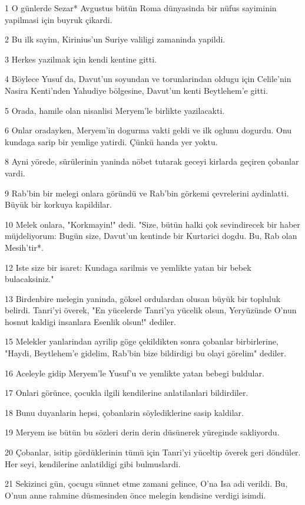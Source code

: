 \par 1 O günlerde Sezar* Avgustus bütün Roma dünyasinda bir nüfus sayiminin yapilmasi için buyruk çikardi.
\par 2 Bu ilk sayim, Kirinius'un Suriye valiligi zamaninda yapildi.
\par 3 Herkes yazilmak için kendi kentine gitti.
\par 4 Böylece Yusuf da, Davut'un soyundan ve torunlarindan oldugu için Celile'nin Nasira Kenti'nden Yahudiye bölgesine, Davut'un kenti Beytlehem'e gitti.
\par 5 Orada, hamile olan nisanlisi Meryem'le birlikte yazilacakti.
\par 6 Onlar oradayken, Meryem'in dogurma vakti geldi ve ilk oglunu dogurdu. Onu kundaga sarip bir yemlige yatirdi. Çünkü handa yer yoktu.
\par 8 Ayni yörede, sürülerinin yaninda nöbet tutarak geceyi kirlarda geçiren çobanlar vardi.
\par 9 Rab'bin bir melegi onlara göründü ve Rab'bin görkemi çevrelerini aydinlatti. Büyük bir korkuya kapildilar.
\par 10 Melek onlara, "Korkmayin!" dedi. "Size, bütün halki çok sevindirecek bir haber müjdeliyorum: Bugün size, Davut'un kentinde bir Kurtarici dogdu. Bu, Rab olan Mesih'tir*.
\par 12 Iste size bir isaret: Kundaga sarilmis ve yemlikte yatan bir bebek bulacaksiniz."
\par 13 Birdenbire melegin yaninda, göksel ordulardan olusan büyük bir topluluk belirdi. Tanri'yi överek, "En yücelerde Tanri'ya yücelik olsun, Yeryüzünde O'nun hosnut kaldigi insanlara Esenlik olsun!" dediler.
\par 15 Melekler yanlarindan ayrilip göge çekildikten sonra çobanlar birbirlerine, "Haydi, Beytlehem'e gidelim, Rab'bin bize bildirdigi bu olayi görelim" dediler.
\par 16 Aceleyle gidip Meryem'le Yusuf'u ve yemlikte yatan bebegi buldular.
\par 17 Onlari görünce, çocukla ilgili kendilerine anlatilanlari bildirdiler.
\par 18 Bunu duyanlarin hepsi, çobanlarin söylediklerine sasip kaldilar.
\par 19 Meryem ise bütün bu sözleri derin derin düsünerek yüreginde sakliyordu.
\par 20 Çobanlar, isitip gördüklerinin tümü için Tanri'yi yüceltip överek geri döndüler. Her seyi, kendilerine anlatildigi gibi bulmuslardi.
\par 21 Sekizinci gün, çocugu sünnet etme zamani gelince, O'na Isa adi verildi. Bu, O'nun anne rahmine düsmesinden önce melegin kendisine verdigi isimdi.
